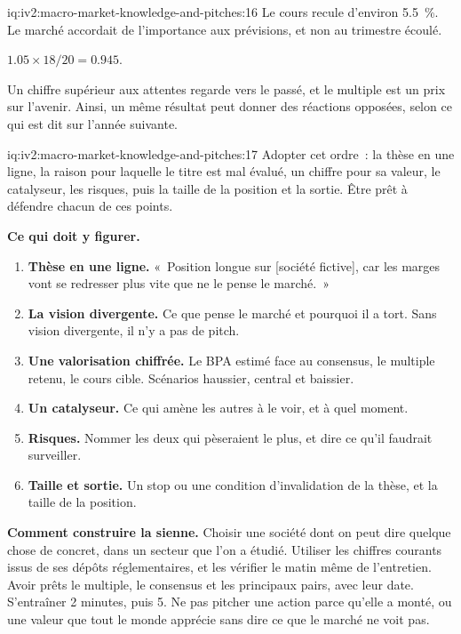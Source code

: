 \begin{solution}{iq:iv2:macro-market-knowledge-and-pitches:16}
Le cours recule d'environ 5.5~\%. Le marché accordait de l'importance aux prévisions, et non au trimestre écoulé.

$1.05 \times 18/20 = 0.945$.

Un chiffre supérieur aux attentes regarde vers le passé, et le multiple est un prix sur l'avenir. Ainsi, un même résultat peut donner des réactions opposées, selon ce qui est dit sur l'année suivante.

\end{solution}

\begin{solution}{iq:iv2:macro-market-knowledge-and-pitches:17}
Adopter cet ordre~: la thèse en une ligne, la raison pour laquelle le titre est mal évalué, un chiffre pour sa valeur, le catalyseur, les risques, puis la taille de la position et la sortie. Être prêt à défendre chacun de ces points.

\textbf{Ce qui doit y figurer.}
\begin{enumerate}
\item \textbf{Thèse en une ligne.} «~Position longue sur [société fictive], car les marges vont se redresser plus vite que ne le pense le marché.~»
\item \textbf{La vision divergente.} Ce que pense le marché et pourquoi il a tort. Sans vision divergente, il n'y a pas de pitch.
\item \textbf{Une valorisation chiffrée.} Le BPA estimé face au consensus, le multiple retenu, le cours cible. Scénarios haussier, central et baissier.
\item \textbf{Un catalyseur.} Ce qui amène les autres à le voir, et à quel moment.
\item \textbf{Risques.} Nommer les deux qui pèseraient le plus, et dire ce qu'il faudrait surveiller.
\item \textbf{Taille et sortie.} Un stop ou une condition d'invalidation de la thèse, et la taille de la position.
\end{enumerate}

\textbf{Comment construire la sienne.} Choisir une société dont on peut dire quelque chose de concret, dans un secteur que l'on a étudié. Utiliser les chiffres courants issus de ses dépôts réglementaires, et les vérifier le matin même de l'entretien. Avoir prêts le multiple, le consensus et les principaux pairs, avec leur date. S'entraîner 2 minutes, puis 5. Ne pas pitcher une action parce qu'elle a monté, ou une valeur que tout le monde apprécie sans dire ce que le marché ne voit pas.


\end{solution}
